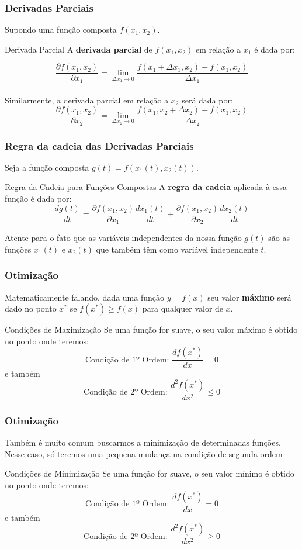\documentclass{beamer}[10]
\begin{document}
\begin{frame}
	\frametitle{Derivadas Parciais}

	Supondo uma função composta $f(x_1,x_2)$.

	\begin{block}{Derivada Parcial}
		A \textbf{derivada parcial} de $f(x_1,x_2)$ em relação a $x_1$ é  dada por:

		$$ \frac{\partial f(x_1,x_2)}{\partial x_1} = 
		\lim_{\Delta x_1 \to 0} \frac{f(x_1+\Delta x_1,x_2) - f(x_1,x_2)}{\Delta x_1} $$
		\\
		Similarmente, a derivada parcial em relação a $x_2$ será dada por:
		\\
		$$ \frac{\partial f(x_1,x_2)}{\partial x_2} = 
		\lim_{\Delta x_2 \to 0} \frac{f(x_1,x_2+\Delta x_2) - f(x_1,x_2)}{\Delta x_2} $$
	\end{block}
\end{frame}

\begin{frame}
	\frametitle{Regra da cadeia das Derivadas Parciais}

	Seja a função composta $g(t) = f(x_1(t),x_2(t))$.

	\begin{block}{Regra da Cadeia para Funções Compostas}
		A \textbf{regra da cadeia} aplicada à essa função é dada por:
		$$ \frac{dg(t)}{dt} = 
		\frac{\partial f(x_1,x_2)}{\partial x_1}\frac{dx_1(t)}{dt} + 
		\frac{\partial f(x_1,x_2)}{\partial x_2}\frac{dx_2(t)}{dt} $$
	\end{block}

	Atente para o fato que as variáveis independentes da nossa função $g(t)$ são as funções $x_1(t)$ e $x_2(t)$ que também têm como variável independente $t$.
\end{frame}

\begin{frame}
	\frametitle{Otimização}

	Matematicamente falando, dada uma função $y = f(x)$ seu valor \textbf{máximo} será dado no ponto $x^*$ se $f(x^*) \geqslant f(x)$ para qualquer valor de $x$.
	\begin{block}{Condições de Maximização}
		Se uma função for suave, o seu valor máximo é obtido no ponto onde teremos:
		$$\textrm{Condição de 1º Ordem: } \frac{df(x^*)}{dx} = 0 $$
		e também
		$$\textrm{Condição de 2º Ordem: } \frac{d^2f(x^*)}{dx^2} \leq 0$$	
	\end{block}
\end{frame}

\begin{frame}
	\frametitle{Otimização}

	Também é muito comum buscarmos a minimização de determinadas funções. Nesse caso, só teremos uma pequena mudança na condição de segunda ordem

	\begin{block}{Condições de Minimização}
		Se uma função for suave, o seu valor mínimo é obtido no ponto onde teremos:
		$$\textrm{Condição de 1º Ordem: } \frac{df(x^*)}{dx} = 0 $$
		e também
		$$\textrm{Condição de 2º Ordem: } \frac{d^2f(x^*)}{dx^2} \geq 0$$	
	\end{block}
\end{frame}
\end{document}
